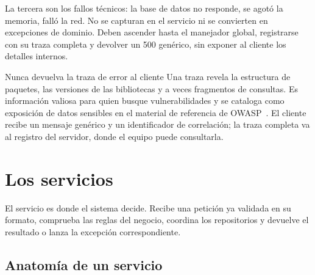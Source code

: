 \documentclass[11pt,a4paper,openany]{book}
\begin{document}
La tercera son los fallos técnicos: la base de datos no responde, se agotó la memoria, falló la red. No se capturan en el servicio ni se convierten en excepciones de dominio. Deben ascender hasta el manejador global, registrarse con su traza completa y devolver un 500 genérico, sin exponer al cliente los detalles internos.

\begin{cajaadvertencia}{Nunca devuelva la traza de error al cliente}
	Una traza revela la estructura de paquetes, las versiones de las bibliotecas y a veces fragmentos de consultas. Es información valiosa para quien busque vulnerabilidades y se cataloga como exposición de datos sensibles en el material de referencia de OWASP~\cite{owasp2021top10}. El cliente recibe un mensaje genérico y un identificador de correlación; la traza completa va al registro del servidor, donde el equipo puede consultarla.
\end{cajaadvertencia}

\section{Los servicios}
\label{sec:servicios}

El servicio es donde el sistema decide. Recibe una petición ya validada en su formato, comprueba las reglas del negocio, coordina los repositorios y devuelve el resultado o lanza la excepción correspondiente.

\subsection{Anatomía de un servicio}
\label{sec:anatomia-servicio}
\end{document}
